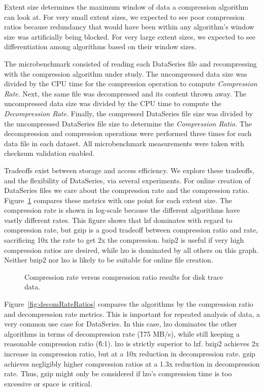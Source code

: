 \documentclass{acm_proc_article-sp}
\begin{document}
Extent size determines the maximum window of data a compression
algorithm can look at.  For very small extent sizes, we expected to
see poor compression ratios because redundancy that would have been
within any algorithm's window size was artificially being blocked.
For very large extent sizes, we expected to see differentiation among
algorithms based on their window sizes.

The microbenchmark consisted of reading each DataSeries file
and recompressing with the compression
algorithm under study.  The uncompressed data size was divided by the CPU time for the compression
operation  to compute {\em
Compression Rate}.  Next, the same file was decompressed and its
content thrown away.  The uncompressed data size was divided by the CPU time 
to compute the {\em Decompression Rate}.  
Finally, the compressed DataSeries file size was
divided by the uncompressed DataSeries file size to determine the {\em
Compression Ratio}.  The decompression and compression operations were
performed three times for each data file in each dataset.  All microbenchmark 
measurements were taken with checksum validation enabled.

Tradeoffs exist between storage and access efficiency.  We
explore these tradeoffs, and the flexibility of DataSeries, via
several experiments.
For online creation of DataSeries files we care about the compression
rate and the compression ratio.
Figure~\ref{fig:comRateRatios} compares these metrics
with one point for each extent size.  The compression rate is shown
in log-scale because the different algorithms have vastly different rates.
This figure shows that lzf dominates
with regard to compression rate, but gzip is a good tradeoff between
compression ratio and rate, sacrificing 10x the rate to get 2x
the compression.  bzip2 is useful if very high compression
ratios are desired, while lzo is dominated by all others on this graph.
Neither bzip2 nor lzo is likely to be suitable for online file creation.


\begin{figure}[tbh]
\caption{ Compression rate versus compression ratio results for disk trace data.}
\label{fig:comRateRatios}
\end{figure}

Figure~\ref{fig:decomRateRatios} compares the algorithms by the
compression ratio and decompression rate metrics.  This is important
for repeated analysis of data, a very common use case for
DataSeries.  In this case, lzo dominates the other algorithms in
terms of decompression rate (\~175 MB/s), while still keeping a
reasonable compression ratio (\~6:1). lzo is strictly superior to lzf.
bzip2 achieves 
2x increase in compression ratio, but at a 
10x
reduction in decompression rate.  gzip achieves negligibly higher
compression ratios at a 
1.3x reduction in decompression rate.
Thus, gzip might only be considered if
lzo's compression time is too excessive or space is critical.
\end{document}

